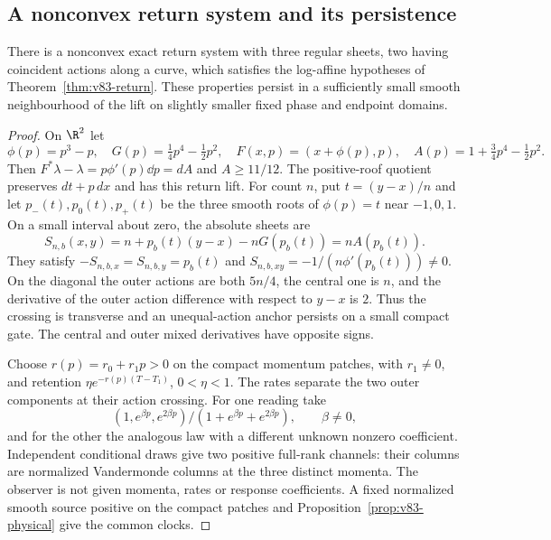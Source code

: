 \subsection{A nonconvex return system and its persistence}
\begin{proposition}
\label{prop:v83-shear}
There is a nonconvex exact return system with three regular sheets,
two having coincident actions along a curve, which satisfies the
log-affine hypotheses of Theorem~\ref{thm:v83-return}. These
properties persist in a sufficiently small smooth neighbourhood of
the lift on slightly smaller fixed phase and endpoint domains.
\end{proposition}
\begin{proof}
On $\R^2$ let
\[
 \phi(p)=p^3-p,\quad G(p)=\tfrac14p^4-\tfrac12p^2,\quad
 F(x,p)=(x+\phi(p),p),\quad A(p)=1+\tfrac34p^4-\tfrac12p^2.
\]
Then $F^*\lambda-\lambda=p\phi'(p)\dd p=dA$ and $A\ge11/12$.
The positive-roof quotient preserves $dt+p\,dx$ and has this return
lift. For count $n$, put $t=(y-x)/n$ and let $p_-(t),p_0(t),p_+(t)$
be the three smooth roots of $\phi(p)=t$ near $-1,0,1$. On a small
interval about zero, the absolute sheets are
\[
 S_{n,b}(x,y)=n+p_b(t)(y-x)-nG(p_b(t))=nA(p_b(t)).
\]
They satisfy $-S_{n,b,x}=S_{n,b,y}=p_b(t)$ and
$S_{n,b,xy}=-1/(n\phi'(p_b(t)))\ne0$. On the diagonal the outer
actions are both $5n/4$, the central one is $n$, and the derivative
of the outer action difference with respect to $y-x$ is $2$.
Thus the crossing is transverse and an unequal-action anchor persists
on a small compact gate. The central and outer mixed derivatives have
opposite signs.

Choose $r(p)=r_0+r_1p>0$ on the compact momentum patches, with
$r_1\ne0$, and retention $\eta e^{-r(p)(T-T_1)}$, $0<\eta<1$.
The rates separate the two outer components at their action crossing.
For one reading take
\[
 (1,e^{\beta p},e^{2\beta p})/(1+e^{\beta p}+e^{2\beta p}),
 \qquad \beta\ne0,
\]
and for the other the analogous law with a different unknown nonzero
coefficient. Independent conditional draws give two positive full-rank
channels: their columns are normalized Vandermonde columns at the
three distinct momenta. The observer is not given momenta, rates or
response coefficients. A fixed normalized smooth source positive on
the compact patches and Proposition~\ref{prop:v83-physical} give the
common clocks.


\end{proof}
